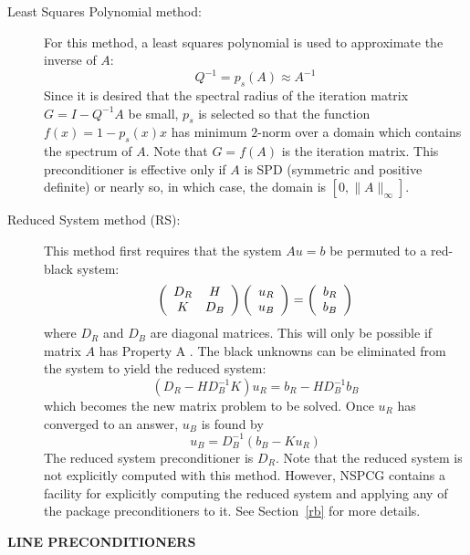 \begin{description}
\item[Least Squares Polynomial method:]
      For this method, a least squares polynomial is used to
      approximate the inverse of $A$:
      \[ Q^{-1} = p_s(A) \approx A^{-1} \]
      Since it is desired that the spectral radius of the iteration 
      matrix $G=I-Q^{-1}A$ be small, $p_s$ is selected so that the 
      function $f(x)=1-p_s(x)x$ has minimum $2$-norm over a domain 
      which contains the spectrum of $A$.  Note that $G=f(A)$ is the 
      iteration matrix.  This preconditioner is effective only if
      $A$ is SPD (symmetric and positive definite) or nearly so,
      in which case, the domain is $[0,\| A \| _\infty]$.
 
\item[Reduced System method (RS):]
      This method first requires that the system $Au=b$
      be permuted to a red-black system:
      \[
        \left( \begin{array}{cc}
                   D_R & H \\
                   K & D_B   \end{array} \right)
        \left( \begin{array}{c}
                   u_R \\
                   u_B       \end{array} \right) =
        \left( \begin{array}{c}
                   b_R \\
                   b_B       \end{array} \right)
      \]
      where $D_R$ and $D_B$ are diagonal matrices.  This will only
      be possible if matrix $A$ has Property A \cite{Young2}.  The 
      black unknowns can be eliminated from the system to yield the
      reduced system:
      \[
         (D_R - H D_B^{-1} K) u_R =  b_R - H D_B^{-1} b_B
      \]
      which becomes the new matrix problem to be solved.  Once
      $u_R$ has converged to an answer, $u_B$ is found by
      \[
          u_B  = D_B^{-1} ( b_B - K u_R )
      \]
      The reduced system preconditioner is $D_R$.  Note that the
      reduced system is not explicitly computed with this
      method.  However, NSPCG contains a facility for explicitly
      computing the reduced system and applying any of the
      package preconditioners to it.  See Section~\ref{rb}
      for more details.
\end{description}
 
\newpage
\noindent
{\bf LINE PRECONDITIONERS}
\bigskip
\indent
 
